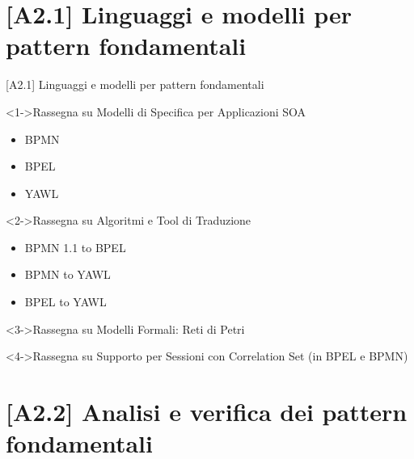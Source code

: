 \documentclass[10pt]{beamer}
\begin{document}
\section{[A2.1] Linguaggi e modelli per pattern fondamentali}
\begin{frame}{[A2.1] Linguaggi e modelli per pattern fondamentali}


\begin{block}<1->{Rassegna su Modelli di Specifica per Applicazioni SOA}
\begin{itemize}
\item BPMN
\item BPEL
\item YAWL
\end{itemize}
\end{block}

\begin{block}<2->{Rassegna su Algoritmi e Tool di Traduzione}
\begin{itemize}
\item BPMN 1.1 to BPEL
\item BPMN to YAWL
\item BPEL to YAWL
\end{itemize}
\end{block}

\begin{block}<3->{Rassegna su Modelli Formali: Reti di Petri}
\end{block}

\begin{block}<4->{Rassegna su Supporto per Sessioni con Correlation Set (in BPEL e BPMN)}
\end{block}
\end{frame}

\section{[A2.2] Analisi e verifica dei pattern fondamentali}
\end{document}
